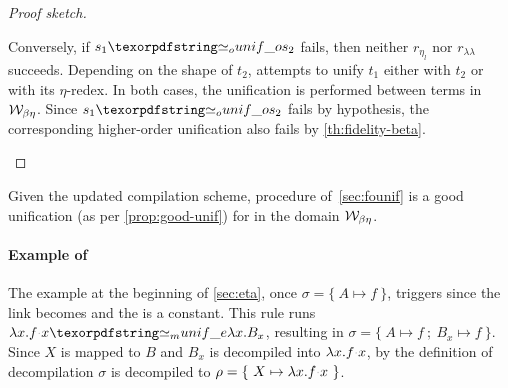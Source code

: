 \begin{proof}[Proof sketch]
\begin{itemize}
    Conversely, if $s_1 \Uo s_2$ fails, then neither $r_{\eta_l}$ nor
    $r_{\lambda\lambda}$ succeeds. Depending on the shape of $t_2$,
    \progressetaleft attempts to unify $t_1$ either with $t_2$ or with its
    $\eta$-redex. In both cases, the unification is performed between terms
    in $\mathcal{W}_{\beta \eta}$. Since $s_1 \Uo s_2$ fails by hypothesis, the
    corresponding higher-order unification also fails by
    \cref{th:fidelity-beta}.
  \end{itemize}
% 
\end{proof}


\begin{corollary}\label{prop:unifetawb}
  Given the updated compilation scheme, procedure \Uo of~\cref{sec:founif}
  is a good unification (as per \cref{prop:good-unif})
  for \Eo in the domain $\mathcal{W}_{\beta\eta}$.
\end{corollary}

\paragraph*{Example of \progressetaleft}

The example at the beginning of \cref{sec:eta}, once
$\sigma = \{~ A \mapsto f ~\}$, triggers \progressetaleft since the link
becomes  and the \lhs is a constant.
This rule runs $\lambda x.f \appsep x \Ue{} \lambda x.B_{x}$,
resulting in $\sigma = \{~ A \mapsto f ~;~ B_{x} \mapsto f ~\}$.
Since $X$ is mapped to $B$ and $B_x$ is decompiled into $\lambda x.f \appsep x$,
by the definition of \linketa decompilation
$\sigma$ is decompiled to $\rho = \{~ X \mapsto \lambda x. f \appsep x ~\}$.

